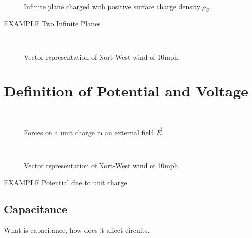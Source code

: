 \begin{figure}[htbp]
\begin{center}
\strut{} \\
\end{center}
\caption{Infinite plane charged with positive surface charge density $\rho_S$.}
\label{wind}
\end{figure}




{\large EXAMPLE} Two Infinite Planes

\begin{figure}[htbp]
\begin{center}
\strut{} \\
\end{center}
\caption{Vector representation of Nort-West wind of 10mph.}
\label{wind}
\end{figure}



\section{Definition of Potential and Voltage}



\begin{figure}[htbp]
\begin{center}
\strut{} \\
\end{center}
\caption{Forces on a unit charge in an external field $\vec{E}$.}
\label{wind}
\end{figure}







\begin{figure}[htbp]
\begin{center}
\strut{} \\
\end{center}
\caption{Vector representation of Nort-West wind of 10mph.}
\label{wind}
\end{figure}


{\large EXAMPLE} Potential due to unit charge





\subsection{Capacitance}
What is capacitance, how does it affect circuits.

